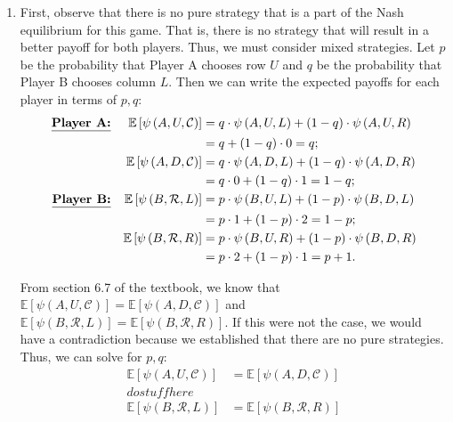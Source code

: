 \documentclass{article}
\newcommand{\pay}[3]{\psi\left(#1,#2,#3\right)}
\newcommand{\expp}[1]{\mathbb{E}\left[ #1 \right]}
\begin{document}
\begin{enumerate}
\begin{enumerate}
        \item First, observe that there is no pure strategy that is a part of the Nash equilibrium for this game. That is, there is no strategy that will result in a better payoff for both players. Thus, we must consider mixed strategies. Let $p$ be the probability that Player A chooses row $U$ and $q$ be the probability that Player B chooses column $L$. Then we can write the expected payoffs for each player in terms of $p,q$:
        \begin{align*}
            \textbf{\underline{Player A:}} && \expp{\pay{A}{U}{\mathcal{C}}} & =q\cdot\pay{A}{U}{L} + (1-q)\cdot\pay{A}{U}{R} \\
            &&& =q+(1-q)\cdot0=q; \\
            && \expp{\pay{A}{D}{\mathcal{C}}} & =q\cdot\pay{A}{D}{L} + (1-q)\cdot\pay{A}{D}{R} \\
            &&& =q\cdot0+(1-q)\cdot1=1-q; \\
            \textbf{\underline{Player B:}} && \expp{\pay{B}{\mathcal{R}}{L}} & =p\cdot\pay{B}{U}{L} + (1-p)\cdot\pay{B}{D}{L} \\\
            &&& =p\cdot1+(1-p)\cdot2=1-p; \\
            && \expp{\pay{B}{\mathcal{R}}{R}} & =p\cdot\pay{B}{U}{R} + (1-p)\cdot\pay{B}{D}{R} \\
            &&& =p\cdot2+(1-p)\cdot1=p+1.
        \end{align*}

        From section 6.7 of the textbook, we know that $\expp{\pay{A}{U}{\mathcal{C}}}=\expp{\pay{A}{D}{\mathcal{C}}}$ and $\expp{\pay{B}{\mathcal{R}}{L}}=\expp{\pay{B}{\mathcal{R}}{R}}$. If this were not the case, we would have a contradiction because we established that there are no pure strategies. Thus, we can solve for $p,q$:
        \begin{align*}
            \expp{\pay{A}{U}{\mathcal{C}}} & =\expp{\pay{A}{D}{\mathcal{C}}} \\
            do stuff here \\
            \expp{\pay{B}{\mathcal{R}}{L}} & =\expp{\pay{B}{\mathcal{R}}{R}}
        \end{align*}


    \end{enumerate}
\end{enumerate}
\end{document}
